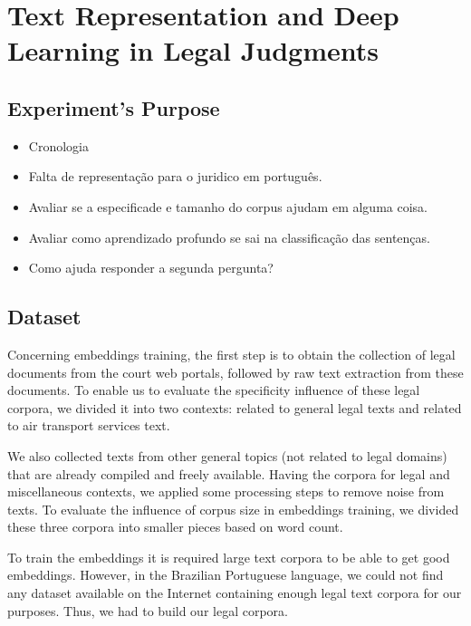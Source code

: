 \section{Text Representation and Deep Learning in Legal Judgments}

\subsection{Experiment's Purpose}

\begin{itemize}[noitemsep]
    \item Cronologia
    \item Falta de representação para o juridico  em português.
    \item Avaliar se a especificade e tamanho do corpus ajudam em alguma coisa.
    \item Avaliar como aprendizado profundo se sai na classificação das sentenças.
    \item Como ajuda responder a segunda pergunta?
\end{itemize}

\subsection{Dataset}

Concerning embeddings training, the first step is to obtain the collection of legal documents from the court web portals, followed by raw text extraction from these documents. To enable us to evaluate the specificity influence of these legal corpora, we divided it into two contexts: related to general legal texts and related to air transport services text.

We also collected texts from other general topics (not related to legal domains) that are already compiled and freely available. Having the corpora for legal and miscellaneous contexts, we applied some processing steps to remove noise from texts. To evaluate the influence of corpus size in embeddings training, we divided these three corpora into smaller pieces based on word count.

To train the embeddings it is required large text corpora to be able to get good embeddings. However, in the Brazilian Portuguese language, we could not find any dataset available on the Internet containing enough legal text corpora for our purposes. Thus, we had to build our legal corpora.

